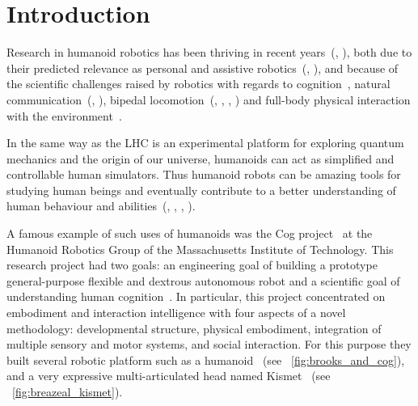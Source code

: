 
\chapter{Introduction} %


Research in humanoid robotics has been thriving in recent years~(\cite{hirai1998development}, \cite{kaneko2008humanoid}), both due to their predicted relevance as personal and assistive robotics~(\cite{tapus2007socially}, \cite{oztop2005human}), and because of the scientific challenges raised by robotics with regards to cognition~\parencite{asada2001cognitive}, natural communication~(\cite{stiefelhagen2004natural}, \cite{breazeal2002robots}), bipedal locomotion~(\cite{yamaguchi1999development}, \cite{chestnutt2005footstep}, \cite{collins2005bipedal}, \cite{Droulez}) and full-body physical interaction with the environment~\parencite{ude2004programming}.

\cite{Fethi}

In the same way as the LHC is an experimental platform for exploring quantum mechanics and the origin of our universe, humanoids can act as simplified and controllable human simulators. Thus humanoid robots can be amazing tools for studying human beings and eventually contribute to a better understanding of human behaviour and abilities~(\cite{atkeson2000using}, \cite{cheng2007cb}, \cite{brooks1986achieving}, \cite{oudeyer2010TAMD}).

A famous example of such uses of humanoids was the Cog project~\parencite{brooks1999cog} at the Humanoid Robotics Group of the Massachusetts Institute of Technology. This research project had two goals: an engineering goal of building a prototype general-purpose flexible and dextrous autonomous robot and a scientific goal of understanding human cognition~\parencite{brooks1994building}. In particular, this project concentrated on embodiment and interaction intelligence with four aspects of a novel methodology: developmental structure, physical embodiment, integration of multiple sensory and motor systems, and social interaction. For this purpose they built several robotic platform such as a humanoid~\parencite{brooks1999cog} (see \figurename~\ref{fig:brooks_and_cog}), and a very expressive multi-articulated head named Kismet~\parencite{breazeal2003emotion} (see \figurename~\ref{fig:breazeal_kismet}).



